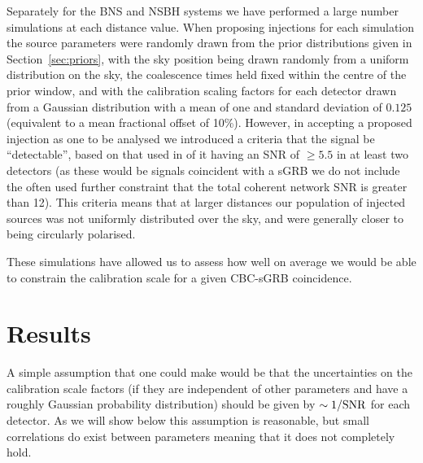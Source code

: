 \documentclass[10pt]{iopart}
\begin{document}
Separately for the \ac{BNS} and \ac{NSBH} systems we have performed a large number simulations at 
each distance value. When proposing injections for each simulation the source parameters were 
randomly drawn from the prior distributions given in Section~\ref{sec:priors}, with the sky 
position being drawn randomly from a uniform distribution on the sky, the coalescence times held 
fixed within the centre of the prior window, and with the calibration scaling factors for each 
detector drawn from a Gaussian distribution with a mean of one and standard deviation of $0.125$ 
(equivalent to a mean fractional offset of 10\%). However, in accepting a proposed injection as one 
to be analysed 
we introduced a criteria that the signal be ``detectable'', based on that used in 
\cite{2012PhRvD..85h2002A} of it having an \ac{SNR} of $\geq 5.5$ in at least two detectors (as 
these would be signals coincident with a \ac{sGRB} we do not include the often used further 
constraint that the total coherent network \ac{SNR} is greater than 12). This criteria means that 
at larger distances our population of injected sources was not uniformly distributed over the sky, 
and were generally closer to being circularly polarised.

These simulations have allowed us to assess how well on average we would be able to constrain the 
calibration scale for a given \ac{CBC}-\ac{sGRB} coincidence.

\section{Results}\label{sec:results}

A simple assumption that one could make would be that the uncertainties on the calibration scale 
factors (if they are independent of other parameters and have a roughly Gaussian probability 
distribution) should be given by $\sim 1/{\rm SNR}$ for each detector. As we will show below this 
assumption is reasonable, but small correlations do exist between parameters meaning that it does 
not completely hold.
\end{document}
